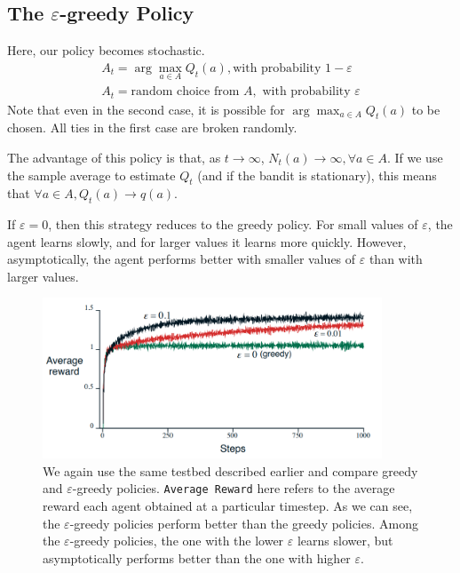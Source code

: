 \documentclass[12pt]{report}
\begin{document}
\subsection{\texorpdfstring{The $\varepsilon$-greedy Policy}{}}
Here, our policy becomes stochastic.
\begin{eqnarray}
    A_{t} = \arg\max_{a \in A} Q_{t}(a), \text{with probability $1 - \varepsilon$}\\
    A_{t} = \text{random choice from $A$}, \text{ with probability $\varepsilon$}
\end{eqnarray}
Note that even in the second case, it is possible for $\arg\max_{a \in A} Q_{t}(a)$ to be chosen. All ties in the first case are broken randomly.

The advantage of this policy is that, as $t \rightarrow \infty$, $N_{t}(a) \rightarrow \infty, \forall a \in A$. If we use the sample average to estimate 
$Q_{t}$ (and if the bandit is stationary), this means that $\forall a \in A, Q_{t}(a) \rightarrow q(a)$.

If $\varepsilon = 0$, then this strategy reduces to the greedy policy. For small values of $\varepsilon$, the agent learns slowly, and for larger values it learns more quickly.
However, asymptotically, the agent performs better with smaller values of $\varepsilon$ than with larger values.

\begin{figure}[H]
    \centering
    \includegraphics[width=0.9\textwidth]{images/Epsilon-greedy.png}
    \caption{We again use the same testbed described earlier and compare greedy and $\varepsilon$-greedy policies. \texttt{Average Reward} here refers to the average reward each agent obtained at a particular timestep. As we can see, the $\varepsilon$-greedy policies perform better than the greedy policies. Among the $\varepsilon$-greedy policies, the one with the lower $\varepsilon$ learns slower, but asymptotically performs better than the one with higher $\varepsilon$.}
\end{figure}
\end{document}

